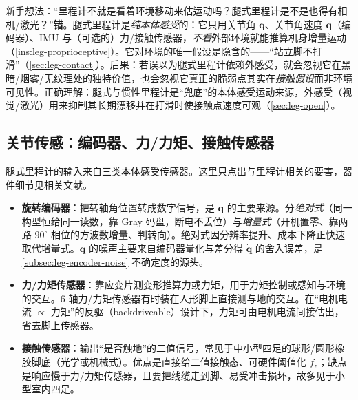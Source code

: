 \begin{pitfall}
新手想法：“里程计不就是看着环境移动来估运动吗？腿式里程计是不是也得有相机/激光？”\textbf{错}。腿式里程计是\emph{纯本体感受}的：它只用关节角 $\mathbf{q}$、关节角速度 $\dot{\mathbf{q}}$（编码器）、IMU 与（可选的）力/接触传感器，\emph{不看}外部环境就能推算机身增量运动（\cref{ins:leg-proprioceptive}）。它对环境的唯一假设是隐含的——“站立脚不打滑”（\cref{sec:leg-contact}）。后果：若误以为腿式里程计依赖外感受，就会忽视它在黑暗/烟雾/无纹理处的独特价值，也会忽视它真正的脆弱点其实在\emph{接触假设}而非环境可见性。正确理解：腿式与惯性里程计是“兜底”的本体感受运动来源，外感受（视觉/激光）用来抑制其长期漂移并在打滑时使接触点速度可观（\cref{sec:leg-open}）。
\end{pitfall}

\subsection{关节传感：编码器、力/力矩、接触传感器}
\label{subsec:leg-sensing}

腿式里程计的输入来自三类本体感受传感器。这里只点出与里程计相关的要害，器件细节见相关文献\cite{carlone2026handbook}。
\begin{itemize}
  \item \textbf{旋转编码器}：把转轴角位置转成数字信号，是 $\mathbf{q}$ 的主要来源。分\emph{绝对式}（同一构型恒给同一读数，靠 Gray 码盘，断电不丢位）与\emph{增量式}（开机置零、靠两路 $90^\circ$ 相位的方波数增量、判转向）。绝对式因分辨率提升、成本下降正快速取代增量式。$\mathbf{q}$ 的噪声主要来自编码器量化与差分得 $\dot{\mathbf{q}}$ 的舍入误差，是 \cref{subsec:leg-encoder-noise} 不确定度的源头。
  \item \textbf{力/力矩传感器}：靠应变片测变形推算力或力矩，用于力矩控制或感知与环境的交互。$6$ 轴力/力矩传感器有时装在人形脚上直接测与地的交互。在“电机电流 $\propto$ 力矩”的反驱（backdriveable）设计下\cite{carlone2026handbook}，力矩可由电机电流间接估出，省去脚上传感器。
  \item \textbf{接触传感器}：输出“是否触地”的二值信号，常见于中小型四足的球形/圆形橡胶脚底（光学或机械式）。优点是直接给二值接触态、可硬件阈值化 $f_z$；缺点是响应慢于力/力矩传感器，且要把线缆走到脚、易受冲击损坏，故多见于小型室内四足。
\end{itemize}


